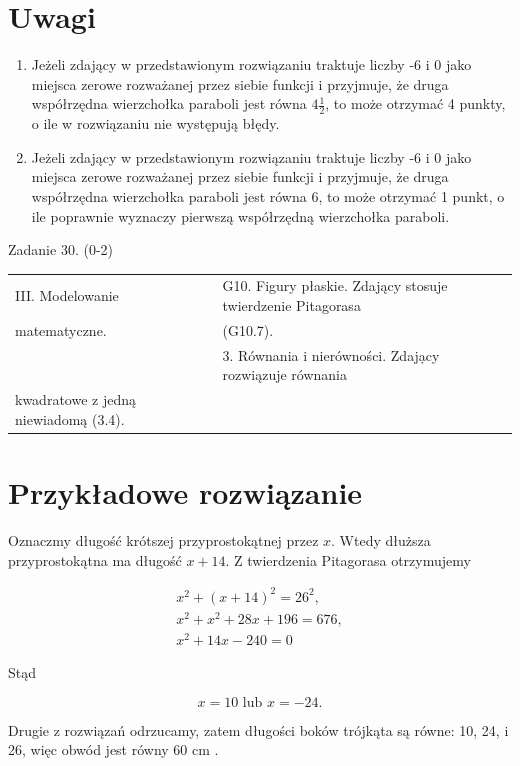 \documentclass[10pt]{article}
\begin{document}
\section*{Uwagi}
\begin{enumerate}
  \item Jeżeli zdający w przedstawionym rozwiązaniu traktuje liczby -6 i 0 jako miejsca zerowe rozważanej przez siebie funkcji i przyjmuje, że druga współrzędna wierzchołka paraboli jest równa $4 \frac{1}{2}$, to może otrzymać 4 punkty, o ile w rozwiązaniu nie występują błędy.
  \item Jeżeli zdający w przedstawionym rozwiązaniu traktuje liczby -6 i 0 jako miejsca zerowe rozważanej przez siebie funkcji i przyjmuje, że druga współrzędna wierzchołka paraboli jest równa 6, to może otrzymać 1 punkt, o ile poprawnie wyznaczy pierwszą współrzędną wierzchołka paraboli.
\end{enumerate}

Zadanie 30. (0-2)

\begin{center}
\begin{tabular}{|l|l|}
\hline
III. Modelowanie & G10. Figury płaskie. Zdający stosuje twierdzenie Pitagorasa \\
matematyczne. & (G10.7). \\
 & 3. Równania i nierówności. Zdajạcy rozwiązuje równania \\
kwadratowe z jedną niewiadomą (3.4). &  \\
\hline
\end{tabular}
\end{center}

\section*{Przykładowe rozwiązanie}
Oznaczmy długość krótszej przyprostokątnej przez $x$. Wtedy dłuższa przyprostokątna ma długość $x+14$. Z twierdzenia Pitagorasa otrzymujemy

$$
\begin{gathered}
x^{2}+(x+14)^{2}=26^{2}, \\
x^{2}+x^{2}+28 x+196=676, \\
x^{2}+14 x-240=0
\end{gathered}
$$

Stąd

$$
x=10 \text { lub } x=-24 .
$$

Drugie z rozwiązań odrzucamy, zatem długości boków trójkąta są równe: 10, 24, i 26, więc obwód jest równy 60 cm .
\end{document}
